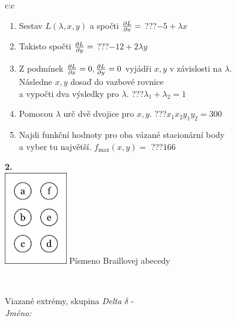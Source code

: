 \documentclass[10pt]{report}
\begin{document}
\begin{tabular}{c:c}
\begin{minipage}[c][104.5mm][t]{0.5\linewidth}
\begin{center}
\begin{minipage}{0.79\linewidth}
\begin{center}
\begin{varwidth}{\linewidth}
\begin{enumerate}
\item Sestav $L(\lambda,x,y)$ a spočti $\pdv{L}{x}=$\quad \dotfill\; ???\;\dotfill \quad $-5+\lambda x$
\item Takisto spočti $\pdv{L}{y}=$\quad \dotfill\; ???\;\dotfill \quad $-12+2\lambda y$
\item Z podmínek $\pdv{L}{x}=0 , \pdv{L}{y}=0$ vyjádři $x,y$ v závislosti na $\lambda$.\\ \phantom{xxxxxx}Následne $x,y$ dosaď do vazbové rovnice\\ \phantom{xxxxxx}a vypočti dva výsledky pro $\lambda$.\quad \dotfill\; ???\;\dotfill \quad $\lambda_1+\lambda_2=1$
\item Pomocou $\lambda$ urč dvě dvojice pro $x,y$.\quad \dotfill\; ???\;\dotfill \quad $x_1 x_2 y_1 y_2=300$
\item Najdi funkční hodnoty pro oba vázané stacionární body\\ \phantom{xxxxxx}a vyber tu najvětší. $f_{\text{max}}(x,y)=$\quad \dotfill\; ???\;\dotfill \quad $166$
\end{enumerate}
\end{varwidth}
\end{center}
\end{minipage}
\begin{minipage}{0.20\linewidth}
\begin{center}
{\Huge\bfseries 2.} \\[2mm]
\includegraphics[height=40mm]{../images/braille.png}
{\small Písmeno Braillovej abecedy}
\end{center}
\end{minipage}
\end{center}
\end{minipage}
\\ \hdashline
\begin{minipage}[c][104.5mm][t]{0.5\linewidth}
\begin{center}
\vspace{7mm}
{\huge Viazané extrémy, skupina \textit{Delta $\delta$} -}\\[5mm]
\textit{Jméno:}\phantom{xxxxxxxxxxxxxxxxxxxxxxxxxxxxxxxxxxxxxxxxxxxxxxxxxxxxxxxxxxxxxxxxx}\\[5mm]

\end{center}
\end{minipage}
\end{tabular}
\end{document}
